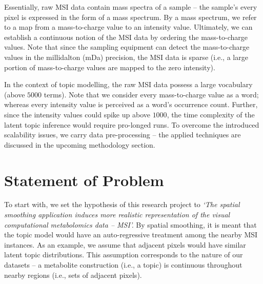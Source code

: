 \documentclass{mpaper}
\begin{document}
\par Essentially, raw MSI data contain mass spectra of a sample -- the sample's every pixel is expressed in the form of a mass spectrum. By a mass spectrum, we refer to a map from a mass-to-charge value to an intensity value. Ultimately, we can establish a continuous notion of the MSI data by ordering the mass-to-charge values. Note that since the sampling equipment can detect the mass-to-charge values in the millidalton (mDa) precision, the MSI data is sparse (i.e., a large portion of mass-to-charge values are mapped to the zero intensity).

\par In the context of topic modelling, the raw MSI data possess a large vocabulary (above $5000$ terms). Note that we consider every mass-to-charge value as a word; whereas every intensity value is perceived as a word's occurrence count. Further, since the intensity values could spike up above $1000$, the time complexity of the latent topic inference would require pro-longed runs. To overcome the introduced scalability issues, we carry data pre-processing -- the applied techniques are discussed in the upcoming methodology section.

\section{Statement of Problem}

\par To start with, we set the hypothesis of this research project to \textit{`The spatial smoothing application induces more realistic representation of the visual computational metabolomics data -- MSI'.} By spatial smoothing, it is meant that the topic model would have an auto-regressive treatment among the nearby MSI instances. As an example, we assume that adjacent pixels would have similar latent topic distributions. This assumption corresponds to the nature of our datasets -- a metabolite construction (i.e., a topic) is continuous throughout nearby regions (i.e., sets of adjacent pixels).
\end{document}
